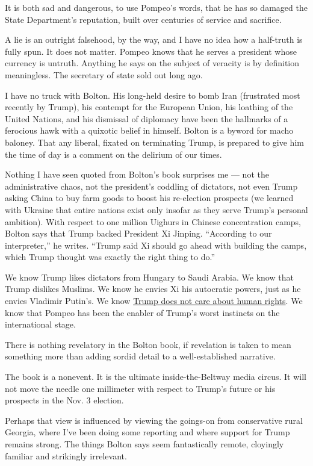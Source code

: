 It is both sad and dangerous, to use Pompeo's words, that he has so
damaged the State Department's reputation, built over centuries of
service and sacrifice.

A lie is an outright falsehood, by the way, and I have no idea how a
half-truth is fully spun. It does not matter. Pompeo knows that he
serves a president whose currency is untruth. Anything he says on the
subject of veracity is by definition meaningless. The secretary of state
sold out long ago.

I have no truck with Bolton. His long-held desire to bomb Iran
(frustrated most recently by Trump), his contempt for the European
Union, his loathing of the United Nations, and his dismissal of
diplomacy have been the hallmarks of a ferocious hawk with a quixotic
belief in himself. Bolton is a byword for macho baloney. That any
liberal, fixated on terminating Trump, is prepared to give him the time
of day is a comment on the delirium of our times.

Nothing I have seen quoted from Bolton's book surprises me --- not the
administrative chaos, not the president's coddling of dictators, not
even Trump asking China to buy farm goods to boost his re-election
prospects (we learned with Ukraine that entire nations exist only
insofar as they serve Trump's personal ambition). With respect to one
million Uighurs in Chinese concentration camps, Bolton says that Trump
backed President Xi Jinping. ``According to our interpreter,'' he
writes. ``Trump said Xi should go ahead with building the camps, which
Trump thought was exactly the right thing to do.''

We know Trump likes dictators from Hungary to Saudi Arabia. We know that
Trump dislikes Muslims. We know he envies Xi his autocratic powers, just
as he envies Vladimir Putin's. We know
\href{https://www.nytimes.com/2019/07/12/opinion/trump-pompeo-human-rights.html}{Trump
does not care about human rights}. We know that Pompeo has been the
enabler of Trump's worst instincts on the international stage.

There is nothing revelatory in the Bolton book, if revelation is taken
to mean something more than adding sordid detail to a well-established
narrative.

The book is a nonevent. It is the ultimate inside-the-Beltway media
circus. It will not move the needle one millimeter with respect to
Trump's future or his prospects in the Nov. 3 election.

Perhaps that view is influenced by viewing the goings-on from
conservative rural Georgia, where I've been doing some reporting and
where support for Trump remains strong. The things Bolton says seem
fantastically remote, cloyingly familiar and strikingly irrelevant.

